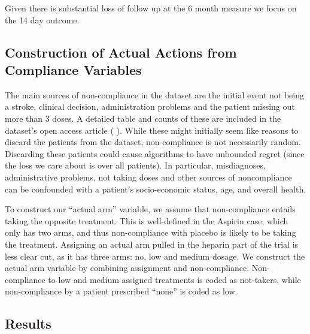 Given there is substantial loss of follow up at the 6 month measure we focus on the 14 day outcome.


\subsection{Construction of Actual Actions from Compliance Variables}
The main sources of non-compliance in the dataset are the initial event not being a stroke, clinical decision, administration problems and the patient missing out more than 3 doses. A detailed table and counts of these are included in the dataset's open access article ( \cite{ist:11}). 
While these might initially seem like reasons to discard the patients from the dataset, non-compliance is not necessarily random. Discarding these patients could cause algorithms to have unbounded regret (since the loss we care about is over all patients). In particular, misdiagnoses, administrative problems, not taking doses and other sources of noncompliance can be confounded with a patient's socio-economic status, age, and overall health. 

To construct our ``actual arm'' variable, we assume that non-compliance entails taking the opposite treatment.
This is well-defined in the Aspirin case, which only has two arms, and thus non-compliance with placebo is likely to be taking the treatment.
Assigning an actual arm pulled in the heparin part of the trial is less clear cut, as it has three arms: no, low and medium dosage. We construct the actual arm variable by combining assignment and non-compliance. Non-compliance to low and medium assigned treatments is coded as not-takers, while non-compliance by a patient prescribed ``none'' is coded as low.


\subsection{Results}

